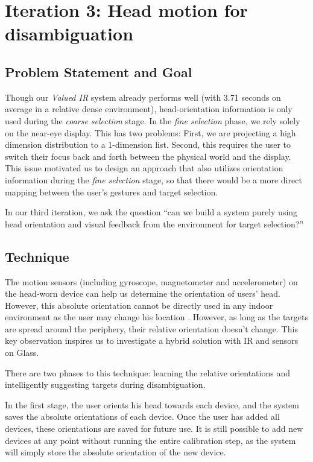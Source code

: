 \section{Iteration 3: Head motion for disambiguation}
\label{sec:iteration-3:-head}
\subsection{Problem Statement and Goal}
Though our {\em Valued IR} system already performs well (with 3.71 seconds on average in a relative dense environment), head-orientation information is only used during the {\em coarse selection} stage. In the {\em fine selection} phase, we rely solely on the near-eye display. This has two problems: First, we are projecting a high dimension distribution to a 1-dimension list. Second, this requires the user to switch their focus back and forth between the physical world and the display. This issue motivated us to design an approach that also utilizes orientation information during the {\em fine selection} stage, so that there would be a more direct mapping between the user's gestures and target selection.

In our third iteration, we ask the question ``can we build a system purely using head orientation and visual feedback from the environment for target selection?''

\subsection{Technique}
The motion sensors (including gyroscope, magnetometer and accelerometer) on the head-worn device can help us determine the orientation of users' head. However, this absolute orientation cannot be directly used in any indoor environment as the user may change his location . However, as long as the targets are spread around the periphery, their relative orientation doesn't change. This key observation inspires us to investigate a hybrid solution with IR and sensors on Glass.

There are two phases to this technique: learning the relative orientations and intelligently suggesting targets during disambiguation.

In the first stage, the user orients his head towards each device, and the system saves the absolute orientations of each device. Once the user has added all devices, these orientations are saved for future use. It is still possible to add new devices at any point without running the entire calibration step, as the system will simply store the absolute orientation of the new device.

